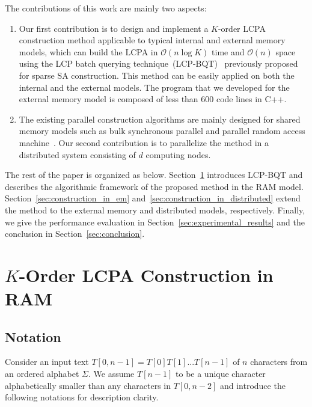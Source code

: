 \documentclass[article]{IEEEtran}
\theoremstyle{definition}
\theoremstyle{remark}
\numberwithin{equation}{section}
\begin{document}
The contributions of this work are mainly two aspects:
\begin{enumerate}
\item Our first contribution is to design and implement a $K$-order LCPA construction method applicable to typical internal and external memory models, which can build the LCPA in $\mathcal{O}(n\log K)$ time and $\mathcal{O}(n)$ space using the LCP batch querying technique~(LCP-BQT)~\cite{Philip2013} previously proposed for sparse SA construction. This method can be easily applied on both the internal and the external models. The program that we developed for the external memory model is composed of less than 600 code lines in C++.
\item The existing parallel construction algorithms are mainly designed for shared memory models such as bulk synchronous parallel and parallel random access machine~\cite{Shun2014,Deo2013}. Our second contribution is to parallelize the method in a distributed system consisting of $d$ computing nodes.
\end{enumerate}

The rest of the paper is organized as below.
Section~\ref{sec:construction_in_ram} introduces LCP-BQT and describes the algorithmic framework of the proposed method in the RAM model.
Section~\ref{sec:construction_in_em} and~\ref{sec:construction_in_distributed} extend the method to the external memory and distributed models, respectively.
Finally, we give the performance evaluation in Section~\ref{sec:experimental_results} and the conclusion in Section~\ref{sec:conclusion}.

\section{$K$-Order LCPA Construction in RAM}\label{sec:construction_in_ram}

\subsection{Notation}\label{subsec:basic_notations}

Consider an input text $T[0,n-1] =T[0]T[1]...T[n-1]$ of $n$ characters from an ordered alphabet $\Sigma$. We assume $T[n-1]$ to be a unique character alphabetically smaller than any characters in $T[0,n-2]$ and introduce the following notations for description clarity.
\end{document}
